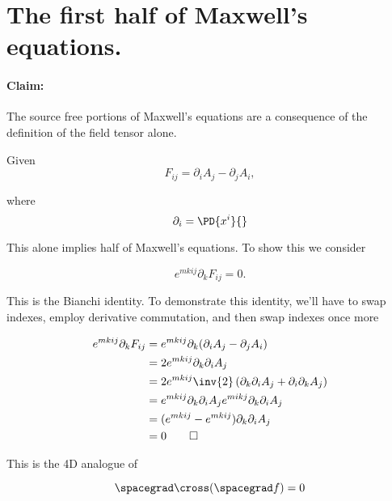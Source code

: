 \section{The first half of Maxwell's equations.}

\paragraph{Claim: } The source free portions of Maxwell's equations are a consequence of the definition of the field tensor alone.

Given
\begin{equation}\label{eqn:relativisticElectrodynamicsL11:670}
F_{i j} = \partial_i A_j - \partial_j A_i,
\end{equation}

where
\begin{equation}\label{eqn:relativisticElectrodynamicsL11:690}
\partial_i = \PD{x^i}{}
\end{equation}

This alone implies half of Maxwell's equations.  To show this we consider

\begin{equation}\label{eqn:relativisticElectrodynamicsL11:710}
e^{m k i j} \partial_k F_{i j} = 0.
\end{equation}

This is the Bianchi identity.  To demonstrate this identity, we'll have to swap indexes, employ derivative commutation, and then swap indexes once more

\begin{align*}
e^{m k i j} \partial_k F_{i j} 
&= e^{m k i j} \partial_k (\partial_i A_j - \partial_j A_i) \\
&= 2 e^{m k i j} \partial_k \partial_i A_j \\
&= 2 e^{m k i j} \inv{2} \left( \partial_k \partial_i A_j + \partial_i \partial_k A_j \right) \\
&= 
e^{m k i j} \partial_k \partial_i A_j 
e^{m i k j} \partial_k \partial_i A_j  \\
&= 
(e^{m k i j} - e^{m k i j}) \partial_k \partial_i A_j \\
&= 0 \qquad \square
\end{align*}

This is the 4D analogue of 

\begin{equation}\label{eqn:relativisticElectrodynamicsL11:790}
\spacegrad \cross (\spacegrad f) = 0
\end{equation}

